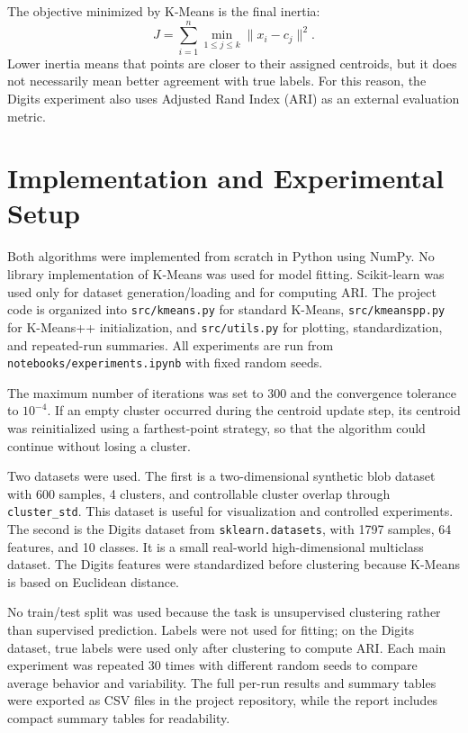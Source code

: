 \documentclass[11pt]{article}
\begin{document}
The objective minimized by K-Means is the final inertia:
\[
J = \sum_{i=1}^{n} \min_{1 \leq j \leq k} \|x_i - c_j\|^2.
\]
Lower inertia means that points are closer to their assigned centroids, but it does not necessarily mean better agreement with true labels. For this reason, the Digits experiment also uses Adjusted Rand Index (ARI) as an external evaluation metric.

\section{Implementation and Experimental Setup}
Both algorithms were implemented from scratch in Python using NumPy. No library implementation of K-Means was used for model fitting. Scikit-learn was used only for dataset generation/loading and for computing ARI. The project code is organized into \texttt{src/kmeans.py} for standard K-Means, \texttt{src/kmeanspp.py} for K-Means++ initialization, and \texttt{src/utils.py} for plotting, standardization, and repeated-run summaries. All experiments are run from \texttt{notebooks/experiments.ipynb} with fixed random seeds.

The maximum number of iterations was set to 300 and the convergence tolerance to \(10^{-4}\). If an empty cluster occurred during the centroid update step, its centroid was reinitialized using a farthest-point strategy, so that the algorithm could continue without losing a cluster.

Two datasets were used. The first is a two-dimensional synthetic blob dataset with 600 samples, 4 clusters, and controllable cluster overlap through \texttt{cluster\_std}. This dataset is useful for visualization and controlled experiments. The second is the Digits dataset from \texttt{sklearn.datasets}, with 1797 samples, 64 features, and 10 classes. It is a small real-world high-dimensional multiclass dataset. The Digits features were standardized before clustering because K-Means is based on Euclidean distance.

No train/test split was used because the task is unsupervised clustering rather than supervised prediction. Labels were not used for fitting; on the Digits dataset, true labels were used only after clustering to compute ARI. Each main experiment was repeated 30 times with different random seeds to compare average behavior and variability. The full per-run results and summary tables were exported as CSV files in the project repository, while the report includes compact summary tables for readability.
\end{document}
